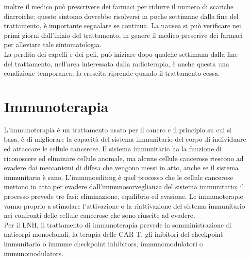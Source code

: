 inoltre il medico può prescrivere dei farmaci per ridurre il numero di scariche diarroiche; questo sintomo dovrebbe 
risolversi in poche settimane dalla fine del trattamento, è importante segnalare se continua. La nausea si può 
verificare nei primi giorni dall’inizio del trattamento, in genere il medico prescrive dei farmaci per alleviare 
tale sintomatologia.\\ 
La perdita dei capelli e dei peli, può iniziare dopo qualche settimana dalla fine del trattamento, nell’area 
interessata dalla radioterapia, è anche questa una condizione temporanea, la crescita riprende quando il trattamento 
cessa\cite{UKRADIOTP}.\\ 

\section{Immunoterapia}
L’immunoterapia è un trattamento usato per il cancro e il principio su cui si basa, è di migliorare la capacità 
del sistema immunitario del corpo di individuare ed attaccare le cellule cancerose. 
Il sistema immunitario ha la funzione di riconoscere ed eliminare cellule anomale, ma alcune cellule cancerose 
riescono ad evadere dai meccanismi di difesa che vengono messi in atto, anche se il sistema immunitario è sano. 
L’immunoediting è quel processo che le cellule cancerose mettono in atto per evadere dall’immunosorveglianza del 
sistema immunitario; il processo prevede tre fasi: eliminazione, equilibrio ed evasione. Le immunoterapie vanno 
proprio a stimolare l’attivazione o la riattivazione del sistema immunitario nei confronti delle cellule cancerose 
che sono riuscite ad evadere\cite{IMMUNOTP}.\\
Per il LNH, il trattamento di immunoterapia prevede la somministrazione di anticorpi monoclonali, 
la terapia delle CAR-T, gli inibitori del checkpoint immunitario o immune checkpoint inhibitors, 
immunomodulatori o immunomodulators.\\

